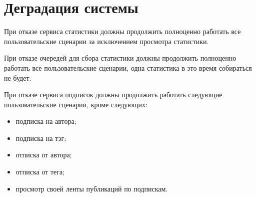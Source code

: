 \section{Деградация системы}

При отказе сервиса статистики должны продолжить полноценно работать все пользовательские сценарии за исключением просмотра статистики.

При отказе очередей для сбора статистики должны продолжить полноценно работать все пользовательские сценарии, одна статистика в это время собираться не будет.

При отказе сервиса подписок должны продолжить работать следующие пользовательские сценарии, кроме следующих:

\begin{itemize}
	\item подписка на автора;
	\item подписка на тэг;
	\item отписка от автора;
	\item отписка от тега;
	\item просмотр своей ленты публикаций по подпискам.
\end{itemize}


